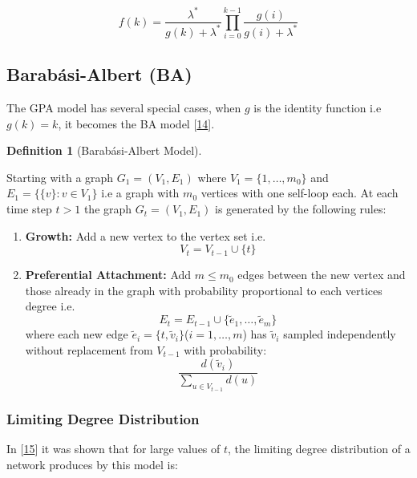 \documentclass[
  10pt,
  a4paper,
]{scrreprt}
\providecommand{\tightlist}{%
  \setlength{\itemsep}{0pt}\setlength{\parskip}{0pt}}\usepackage{longtable,booktabs,array}
\theoremstyle{definition}
\newtheorem{definition}{Definition}[section]
\theoremstyle{plain}
\theoremstyle{plain}
\theoremstyle{remark}
\begin{document}
{\[
f(k) = \displaystyle\frac{\lambda^*}{g(k) + \lambda^*}\prod_{i=0}^{k-1}\displaystyle\frac{g(i)}{g(i)+\lambda^*}
\]

\hypertarget{barabuxe1si-albert-ba}{%
\subsection{Barabási-Albert (BA)}\label{barabuxe1si-albert-ba}}

The GPA model has several special cases, when \(g\) is the identity
function i.e \(g(k)=k\), it becomes the BA model
{[}\protect\hyperlink{ref-Barabasi99}{14}{]}.

\begin{definition}[Barabási-Albert
Model]\protect\hypertarget{def-ba}{}\label{def-ba}

Starting with a graph \(G_1 = (V_1, E_1)\) where
\(V_1 = \{1,\ldots,m_0\}\) and \(E_1 = \{\{v\}:v\in V_1\}\) i.e a graph
with \(m_0\) vertices with one self-loop each. At each time step \(t>1\)
the graph \(G_t = (V_1, E_1)\) is generated by the following rules:

\begin{enumerate}
\def\labelenumi{\arabic{enumi}.}
\tightlist
\item
  \textbf{Growth:} Add a new vertex to the vertex set i.e.~\[
  V_t = V_{t-1} \cup \{t\}
  \]
\item
  \textbf{Preferential Attachment:} Add \(m\le m_0\) edges between the
  new vertex and those already in the graph with probability
  proportional to each vertices degree i.e.~\[
  E_t  = E_{t-1} \cup \{\tilde e_1, \ldots, \tilde e_m\}
  \] where each new edge
  \(\tilde e_i = \{t, \tilde v_i\}\)(\(i=1,\ldots, m\)) has
  \(\tilde v_i\) sampled independently without replacement from
  \(V_{t-1}\) with probability: \[
  \frac{d(\tilde v_i)}{\sum_{u\in V_{t-1}}d(u)}
  \]
\end{enumerate}

\end{definition}

\hypertarget{limiting-degree-distribution-1}{%
\subsubsection{Limiting Degree
Distribution}\label{limiting-degree-distribution-1}}

In {[}\protect\hyperlink{ref-barabasibook}{15}{]} it was shown that for
large values of \(t\), the limiting degree distribution of a network
produces by this model is:

}
\end{document}
